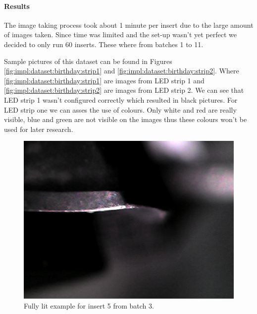 			\paragraph{Results}
			The image taking process took about 1 minute per insert due to the large amount of images taken. Since time was limited and the set-up wasn't yet perfect we decided to only run 60 inserts. These where from batches 1 to 11. 

			Sample pictures of this dataset can be found in Figures \ref{fig:impl:dataset:birthday:strip1} and \ref{fig:impl:dataset:birthday:strip2}. Where \ref{fig:impl:dataset:birthday:strip1} are images from LED strip 1 and \ref{fig:impl:dataset:birthday:strip2} are images from LED strip 2. We can see that LED strip 1 wasn't configured correctly which resulted in black pictures. For LED strip one we can asses the use of colours. Only white and red are really visible, blue and green are not visible on the images thus these colours won't be used for later research.



			\begin{figure}[hbtp]
				\centering
				\includegraphics[width=.3\textwidth, keepaspectratio=true]{./fig/Vision/Dataset/automated_datasets/2_created_datasets/1_Birthday_dataset/b_003_p_005_l_000_b.png}
				\caption{Fully lit example for insert 5 from batch 3.}
			\end{figure}

